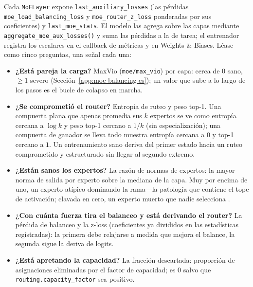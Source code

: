Cada \texttt{MoELayer} expone \texttt{last\_auxiliary\_losses} (las pérdidas
\texttt{moe\_load\_balancing\_loss} y \texttt{moe\_router\_z\_loss} ponderadas
por sus coeficientes) y \texttt{last\_moe\_stats}. El modelo las agrega sobre
las capas mediante \texttt{aggregate\_moe\_aux\_losses()} y suma las pérdidas a
la de tarea; el entrenador registra los escalares en el callback de métricas y
en Weights \& Biases. Léase como cinco preguntas, una señal cada una:
\begin{itemize}[leftmargin=1.4em]
  \item \textbf{¿Está pareja la carga?} MaxVio (\texttt{moe/max\_vio}) por
        capa: cerca de $0$ sano, $\geqslant 1$ severo
        (Sección~\ref{app:moe-balancing-es}); un valor que sube a lo largo de
        los pasos es el bucle de colapso en marcha.
  \item \textbf{¿Se comprometió el router?} Entropía de ruteo y peso top-1.
        Una compuerta plana que apenas promedia sus $k$ expertos se ve como
        entropía cercana a $\log k$ y peso top-1 cercano a $1/k$ (sin
        especialización); una compuerta de ganador se lleva todo muestra
        entropía cercana a $0$ y top-1 cercano a $1$. Un entrenamiento sano
        deriva del primer estado hacia un ruteo comprometido y estructurado
        sin llegar al segundo extremo.
  \item \textbf{¿Están sanos los expertos?} La razón de normas de expertos:
        la mayor norma de salida por experto sobre la mediana de la capa. Muy
        por encima de uno, un experto atípico dominando la rama---la patología
        que contiene el tope de activación; clavada en cero, un experto muerto
        que nadie selecciona \citep{huang2026step35}.
  \item \textbf{¿Con cuánta fuerza tira el balanceo y está derivando el
        router?} La pérdida de balanceo y la z-loss (coeficientes ya divididos
        en las estadísticas registradas): la primera debe relajarse a medida
        que mejora el balance, la segunda sigue la deriva de logits.
  \item \textbf{¿Está apretando la capacidad?} La fracción descartada:
        proporción de asignaciones eliminadas por el factor de capacidad; es
        $0$ salvo que \texttt{routing.capacity\_factor} sea positivo.
\end{itemize}

